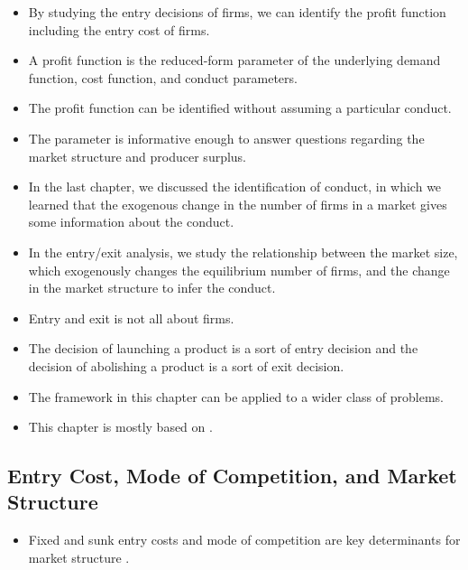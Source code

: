 \documentclass[]{book}
\providecommand{\tightlist}{%
  \setlength{\itemsep}{0pt}\setlength{\parskip}{0pt}}
\begin{document}
\begin{itemize}
\tightlist
\item
  By studying the entry decisions of firms, we can identify the profit
  function including the entry cost of firms.
\item
  A profit function is the reduced-form parameter of the underlying
  demand function, cost function, and conduct parameters.
\item
  The profit function can be identified without assuming a particular
  conduct.
\item
  The parameter is informative enough to answer questions regarding the
  market structure and producer surplus.
\item
  In the last chapter, we discussed the identification of conduct, in
  which we learned that the exogenous change in the number of firms in a
  market gives some information about the conduct.
\item
  In the entry/exit analysis, we study the relationship between the
  market size, which exogenously changes the equilibrium number of
  firms, and the change in the market structure to infer the conduct.
\item
  Entry and exit is not all about firms.
\item
  The decision of launching a product is a sort of entry decision and
  the decision of abolishing a product is a sort of exit decision.
\item
  The framework in this chapter can be applied to a wider class of
  problems.
\item
  This chapter is mostly based on \citet{berry_identification_2006}.
\end{itemize}

\subsection{Entry Cost, Mode of Competition, and Market
Structure}\label{entry-cost-mode-of-competition-and-market-structure}

\begin{itemize}
\tightlist
\item
  Fixed and sunk entry costs and mode of competition are key
  determinants for market structure \citep{sutton_chapter_2007}.
\end{itemize}
\end{document}
